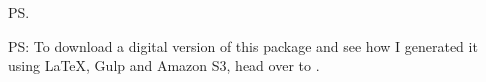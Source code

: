 \ps

PS: To download a digital version of this package and see how I generated it using \LaTeX, Gulp and Amazon S3, head
over to .

